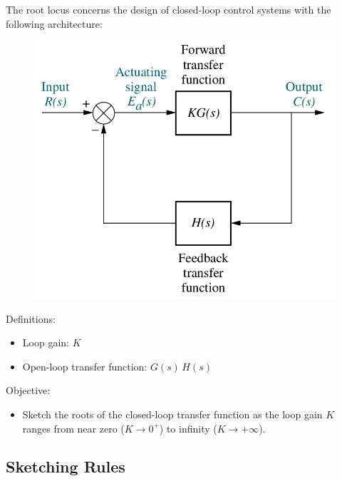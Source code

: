 \documentclass[ 10pt, xcolor = dvipsnames]{beamer}
\begin{document}
\begin{frame}[allowframebreaks]
\frametitle{\insertsection}

The root locus concerns the design of closed-loop control systems with the following architecture: 
\begin{figure}
\centering
\includegraphics[width=0.5\columnwidth]{figures/Nise_Figure-8-1.jpg}
\end{figure}
\framebreak

Definitions: 
\begin{itemize}
\item Loop gain: $K$
\item Open-loop transfer function: $G(s) \, H(s)$
\end{itemize}
\fullskip

Objective: 
\begin{itemize}
\item Sketch the roots of the closed-loop transfer function as the loop gain $K$ \linebreak ranges from near zero (\ie $K \rightarrow 0^+$) to infinity (\ie $K \rightarrow +\infty$). 
\end{itemize}

\end{frame}

\subsection{Sketching Rules}
\end{document}
